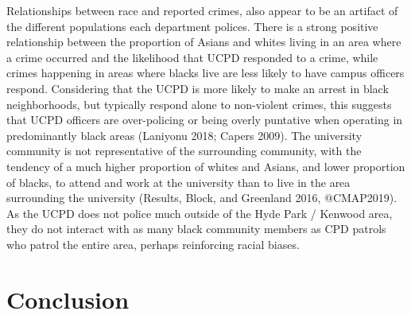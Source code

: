 \documentclass{ucetd}
\begin{document}
Relationships between race and reported crimes, also appear to be an
artifact of the different populations each department polices. There is
a strong positive relationship between the proportion of Asians and
whites living in an area where a crime occurred and the likelihood that
UCPD responded to a crime, while crimes happening in areas where blacks
live are less likely to have campus officers respond. Considering that
the UCPD is more likely to make an arrest in black neighborhoods, but
typically respond alone to non-violent crimes, this suggests that UCPD
officers are over-policing or being overly puntative when operating in
predominantly black areas (Laniyonu 2018; Capers 2009). The university
community is not representative of the surrounding community, with the
tendency of a much higher proportion of whites and Asians, and lower
proportion of blacks, to attend and work at the university than to live
in the area surrounding the university (Results, Block, and Greenland
2016, @CMAP2019). As the UCPD does not police much outside of the Hyde
Park / Kenwood area, they do not interact with as many black community
members as CPD patrols who patrol the entire area, perhaps reinforcing
racial biases.

\begin{table}

\caption{\label{tab:unnamed-chunk-1}Race/Ethnicity Comparison of UChicago and Surrounding Areas}
\centering
{}
\end{table}

\hypertarget{conclusion}{%
\chapter{Conclusion}\label{conclusion}}
\end{document}
